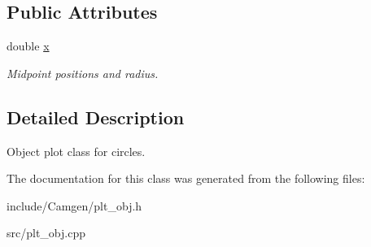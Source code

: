 \subsection*{Public Attributes}
\begin{DoxyCompactItemize}
\item 
\hypertarget{a00421_a5318995607103fd043f898989695804b}{double \hyperlink{a00421_a5318995607103fd043f898989695804b}{x}}\label{a00421_a5318995607103fd043f898989695804b}

\begin{DoxyCompactList}\small\item\em Midpoint positions and radius. \end{DoxyCompactList}\end{DoxyCompactItemize}


\subsection{Detailed Description}
Object plot class for circles. 

The documentation for this class was generated from the following files\-:\begin{DoxyCompactItemize}
\item 
include/\-Camgen/plt\-\_\-obj.\-h\item 
src/plt\-\_\-obj.\-cpp\end{DoxyCompactItemize}

